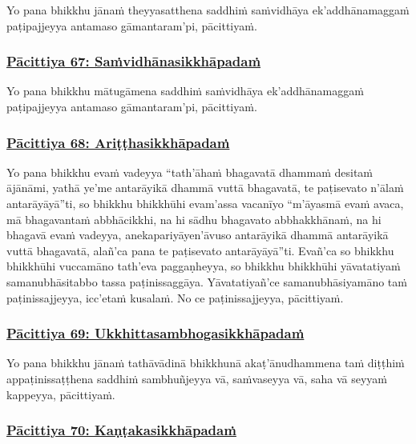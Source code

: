 Yo pana bhikkhu jānaṁ theyyasatthena saddhiṁ saṁvidhāya ek'addhānamaggaṁ paṭipajjeyya antamaso gāmantaram'pi, pācittiyaṁ.

\subsubsection*{\hyperref[exp67]{Pācittiya 67: Saṁvidhānasikkhāpadaṁ}}
\label{pac67}

Yo pana bhikkhu mātugāmena saddhiṁ saṁvidhāya ek'addhānamaggaṁ paṭipajjeyya antamaso gāmantaram'pi, pācittiyaṁ.

\subsubsection*{\hyperref[exp68]{Pācittiya 68: Ariṭṭhasikkhāpadaṁ}}
\label{pac68}

Yo pana bhikkhu evaṁ vadeyya “tath'āhaṁ bhagavatā dhammaṁ desitaṁ ājānāmi, yathā ye'me antarāyikā dhammā vuttā bhagavatā, te paṭisevato n'ālaṁ antarāyāyā”ti, so bhikkhu bhikkhūhi evam'assa vacanīyo “m'āyasmā evaṁ avaca, mā bhagavantaṁ abbhācikkhi, na hi sādhu bhagavato abbhakkhānaṁ, na hi bhagavā evaṁ vadeyya, anekapariyāyen'āvuso antarāyikā dhammā antarāyikā vuttā bhagavatā, alañ'ca pana te paṭisevato antarāyāyā”ti. Evañ'ca so bhikkhu bhikkhūhi vuccamāno tath'eva paggaṇheyya, so bhikkhu bhikkhūhi yāvatatiyaṁ samanubhāsitabbo tassa paṭinissaggāya. Yāvatatiyañ'ce samanubhāsiyamāno taṁ paṭinissajjeyya, icc'etaṁ kusalaṁ. No ce paṭinissajjeyya, pācittiyaṁ.

\subsubsection*{\hyperref[exp69]{Pācittiya 69: Ukkhittasambhogasikkhāpadaṁ}}
\label{pac69}

Yo pana bhikkhu jānaṁ tathāvādinā bhikkhunā akaṭ'ānudhammena taṁ diṭṭhiṁ appaṭinissaṭṭhena saddhiṁ sambhuñjeyya vā, saṁvaseyya vā, saha vā seyyaṁ kappeyya, pācittiyaṁ.

\subsubsection*{\hyperref[exp70]{Pācittiya 70: Kaṇṭakasikkhāpadaṁ}}
\label{pac70}

